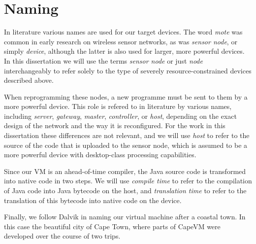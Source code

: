 \section{Naming}
In literature various names are used for our target devices. The word \emph{mote} was common in early research on wireless sensor networks, as was \emph{sensor node}, or simply \emph{device}, although the latter is also used for larger, more powerful devices. In this dissertation we will use the terms \emph{sensor node} or just \emph{node} interchangeably to refer solely to the type of severely resource-constrained devices described above.


When reprogramming these nodes, a new programme must be sent to them by a more powerful device. This role is refered to in literature by various names, including \emph{server}, \emph{gateway}, \emph{master}, \emph{controller}, or \emph{host}, depending on the exact design of the network and the way it is reconfigured. For the work in this dissertation these differences are not relevant, and we will use \emph{host} to refer to the source of the code that is uploaded to the sensor node, which is assumed to be a more powerful device with desktop-class processing capabilities.

Since our VM is an ahead-of-time compiler, the Java source code is transformed into native code in two steps. We will use \emph{compile time} to refer to the compilation of Java code into Java bytecode on the host, and \emph{translation time} to refer to the translation of this bytecode into native code on the device.

Finally, we follow Dalvik in naming our virtual machine after a coastal town. In this case the beautiful city of Cape Town, where parts of CapeVM were developed over the course of two trips.

